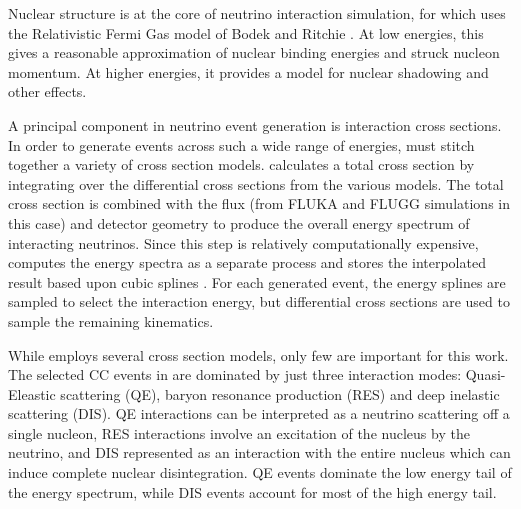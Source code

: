 Nuclear structure is at the core of neutrino interaction simulation, for which
\genie uses the Relativistic Fermi Gas model of Bodek and Ritchie
\cite{bodekritchie}.
At low energies, this gives a reasonable approximation of nuclear binding
energies and struck nucleon momentum.
At higher energies, it provides a model for nuclear shadowing and other
effects.


A principal component in neutrino event generation is interaction cross sections.  In order to generate events across such a wide range of energies, \genie must stitch together a variety of cross section models.  \genie calculates a total cross section by integrating over the differential cross sections from the various models.  The total cross section is combined with the flux (from FLUKA and FLUGG simulations in this case) and detector geometry to produce the overall energy spectrum of interacting neutrinos.
Since this step is relatively computationally expensive, \genie computes the
energy spectra as a separate process and stores the interpolated result
based upon cubic splines \cite{atkinson1978introduction}.
For each generated event, the energy splines are sampled to select the interaction energy, but differential cross sections are used to sample the remaining kinematics.

While \genie employs several cross section models, only few are important for this work.  The selected \numu CC events in \nova are dominated by just three interaction modes: Quasi-Eleastic scattering (QE),  baryon resonance production (RES) and deep inelastic scattering (DIS).
QE interactions can be interpreted as a neutrino scattering off a single
nucleon, RES interactions involve an excitation
of the nucleus by the neutrino, and DIS represented as an interaction
with the entire nucleus which can induce complete
nuclear disintegration.
QE events dominate the low energy tail of the energy spectrum, while DIS events account for most of the high energy tail.

